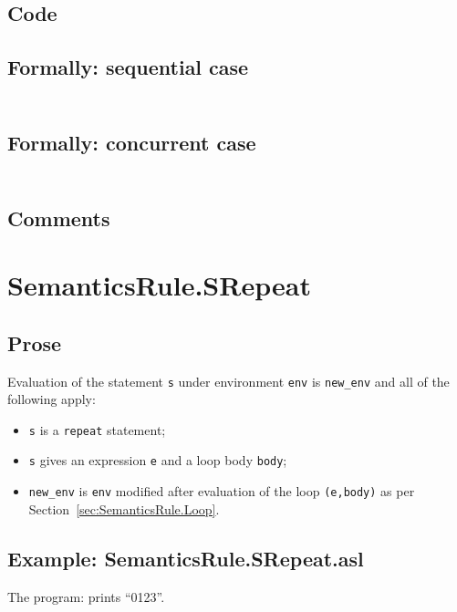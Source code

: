 \documentclass{book}
\begin{document}
  \subsection{Code}

  \subsection{Formally: sequential case}
  \begin{align}
  \end{align} 

  \subsection{Formally: concurrent case}
  \begin{align}
  \end{align} 

    \subsection{Comments}

\section{SemanticsRule.SRepeat \label{sec:SemanticsRule.SRepeat}}

    \subsection{Prose}
  Evaluation of the statement \texttt{s} under environment \texttt{env} is
\texttt{new\_env} and all of the following apply:
    \begin{itemize}
    \item \texttt{s} is a \texttt{repeat} statement;
    \item \texttt{s} gives an expression \texttt{e} and a loop body \texttt{body};
    \item \texttt{new\_env} is \texttt{env} modified after evaluation of the loop \texttt{(e,body)} as per Section~\ref{sec:SemanticsRule.Loop}.
    \end{itemize}

    \subsection{Example: SemanticsRule.SRepeat.asl}
    The program:
    prints ``0123''.
\end{document}
